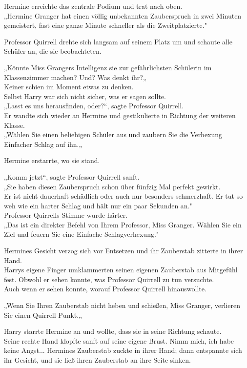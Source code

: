 {Hermine erreichte das zentrale Podium und trat nach oben.\\ „Hermine Granger hat einen völlig unbekannten Zauberspruch in zwei Minuten gemeistert, fast eine ganze Minute schneller als die Zweitplatzierte."

Professor Quirrell drehte sich langsam auf seinem Platz um und schaute alle Schüler an, die sie beobachteten.

„Könnte Miss Grangers Intelligenz sie zur gefährlichsten Schülerin im Klassenzimmer machen? Und? Was denkt ihr?„\\ Keiner schien im Moment etwas zu denken.\\ Selbst Harry war sich nicht sicher, was er sagen sollte.\\ „Lasst es uns herausfinden, oder?“, sagte Professor Quirrell.\\ Er wandte sich wieder an Hermine und gestikulierte in Richtung der weiteren Klasse.\\ „Wählen Sie einen beliebigen Schüler aus und zaubern Sie die Verhexung Einfacher Schlag auf ihn.„

Hermine erstarrte, wo sie stand.

„Komm jetzt“, sagte Professor Quirrell sanft.\\ „Sie haben diesen Zauberspruch schon über fünfzig Mal perfekt gewirkt.\\ Er ist nicht dauerhaft schädlich oder auch nur besonders schmerzhaft. Er tut so weh wie ein harter Schlag und hält nur ein paar Sekunden an."\\ Professor Quirrells Stimme wurde härter.\\ „Das ist ein direkter Befehl von Ihrem Professor, Miss Granger. Wählen Sie ein Ziel und feuern Sie eine Einfache Schlagverhexung."

Hermines Gesicht verzog sich vor Entsetzen und ihr Zauberstab zitterte in ihrer Hand.\\ Harrys eigene Finger umklammerten seinen eigenen Zauberstab aus Mitgefühl fest. Obwohl er sehen konnte, was Professor Quirrell zu tun versuchte.\\ Auch wenn er sehen konnte, worauf Professor Quirrell hinauswollte.

„Wenn Sie Ihren Zauberstab nicht heben und schießen, Miss Granger, verlieren Sie einen Quirrell-Punkt.„

Harry starrte Hermine an und wollte, dass sie in seine Richtung schaute.\\ Seine rechte Hand klopfte sanft auf seine eigene Brust. Nimm mich, ich habe keine Angst... Hermines Zauberstab zuckte in ihrer Hand; dann entspannte sich ihr Gesicht, und sie ließ ihren Zauberstab an ihre Seite sinken.

}
